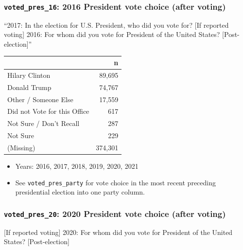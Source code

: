 \documentclass[10pt,article,oneside]{memoir}
\theoremstyle{definition}
\begin{document}
\hypertarget{voted_pres_16-2016-president-vote-choice-after-voting}{%
\subsubsection{\texorpdfstring{\texttt{voted\_pres\_16}: 2016 President
vote choice (after
voting)}{voted\_pres\_16: 2016 President vote choice (after voting)}}\label{voted_pres_16-2016-president-vote-choice-after-voting}}

``2017: In the election for U.S. President, who did you vote for? {[}If
reported voting{]} 2016: For whom did you vote for President of the
United States? {[}Post-election{]}''

\begin{table}[H]
\centering
\begin{tabular}[t]{lr}
\toprule
 & n\\
\midrule
Hilary Clinton & 89,695\\
Donald Trump & 74,767\\
Other / Someone Else & 17,559\\
Did not Vote for this Office & 617\\
Not Sure / Don't Recall & 287\\
Not Sure & 229\\
(Missing) & 374,301\\
\bottomrule
\end{tabular}
\end{table}

\begin{itemize}
\tightlist
\item
  Years: 2016, 2017, 2018, 2019, 2020, 2021
\item
  See \texttt{voted\_pres\_party} for vote choice in the most recent
  preceding presidential election into one party column.
\end{itemize}

\hypertarget{voted_pres_20-2020-president-vote-choice-after-voting}{%
\subsubsection{\texorpdfstring{\texttt{voted\_pres\_20}: 2020 President
vote choice (after
voting)}{voted\_pres\_20: 2020 President vote choice (after voting)}}\label{voted_pres_20-2020-president-vote-choice-after-voting}}

{[}If reported voting{]} 2020: For whom did you vote for President of
the United States? {[}Post-election{]}
\end{document}
